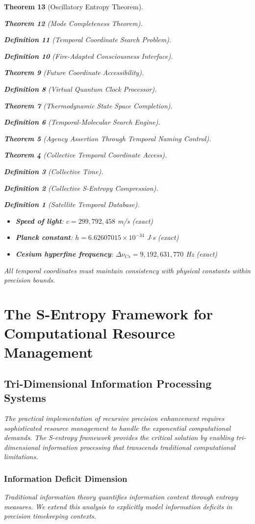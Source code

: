 \documentclass[12pt,a4paper]{article}
\newtheorem{theorem}{Theorem}[section]
\newtheorem{definition}[theorem]{Definition}
\begin{document}
\begin{theorem}[Oscillatory Entropy Theorem]
\begin{theorem}[Mode Completeness Theorem]
\begin{enumerate}
\begin{definition}[Temporal Coordinate Search Problem]
\begin{algorithm}
\begin{definition}[Fire-Adapted Consciousness Interface]
\begin{theorem}[Future Coordinate Accessibility]
\begin{definition}[Virtual Quantum Clock Processor]
\begin{itemize}
\begin{itemize}
\begin{theorem}[Thermodynamic State Space Completion]
\begin{definition}[Temporal-Molecular Search Engine]
\begin{theorem}[Agency Assertion Through Temporal Naming Control]
\begin{remark}
\begin{theorem}[Collective Temporal Coordinate Access]
\begin{definition}[Collective Time]
\begin{definition}[Collective S-Entropy Compression]
\begin{definition}[Satellite Temporal Database]
\begin{algorithm}
\begin{table}[h]
{{\begin{itemize}
\item \textbf{Speed of light}: $c = 299,792,458$ m/s (exact)
\item \textbf{Planck constant}: $h = 6.62607015 \times 10^{-34}$ J$\cdot$s (exact)
\item \textbf{Cesium hyperfine frequency}: $\Delta \nu_{Cs} = 9,192,631,770$ Hz (exact)
\end{itemize}

All temporal coordinates must maintain consistency with physical constants within precision bounds.

\section{The S-Entropy Framework for Computational Resource Management}

\subsection{Tri-Dimensional Information Processing Systems}

The practical implementation of recursive precision enhancement requires sophisticated resource management to handle the exponential computational demands. The S-entropy framework provides the critical solution by enabling tri-dimensional information processing that transcends traditional computational limitations.

\subsubsection{Information Deficit Dimension}

Traditional information theory quantifies information content through entropy measures. We extend this analysis to explicitly model information deficits in precision timekeeping contexts.

}}
\end{table}
\end{algorithm}
\end{definition}
\end{definition}
\end{definition}
\end{theorem}
\end{remark}
\end{theorem}
\end{definition}
\end{theorem}
\end{itemize}
\end{itemize}
\end{definition}
\end{theorem}
\end{definition}
\end{algorithm}
\end{definition}
\end{enumerate}
\end{theorem}
\end{theorem}
\end{document}
